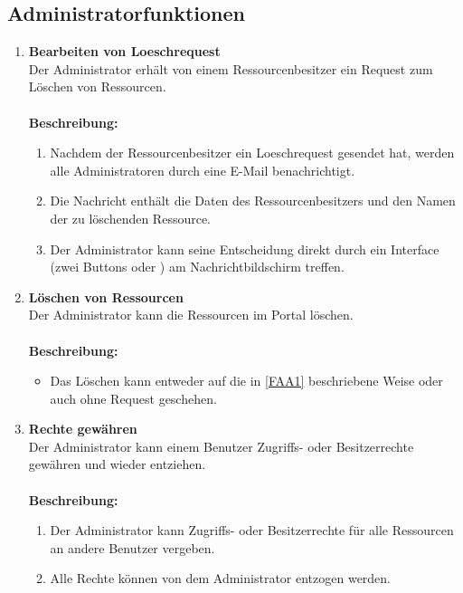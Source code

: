 \documentclass[parskip=full,11pt]{scrartcl}
\def\threedigits#1{%
  \ifnum#1<10 0\fi
  \ifnum#1<1 0\fi
  \number#1}
\begin{document}
\subsection{Administratorfunktionen}
\begin{enumerate}[label={\textbf{/F\protect\threedigits{\theenumi}0/}}, leftmargin=*, resume]
\item \label{FAA1}\textbf{Bearbeiten von Loeschrequest}\\ Der Administrator erhält von einem Ressourcenbesitzer ein Request zum Löschen von Ressourcen.\\\\
\textbf{Beschreibung:}\\
\begin{enumerate}[label=(\arabic*), leftmargin=*]
\item Nachdem der Ressourcenbesitzer ein Loeschrequest gesendet hat, werden alle Administratoren durch eine E-Mail benachrichtigt.
\item Die Nachricht enthält die Daten des Ressourcenbesitzers und den Namen der zu löschenden Ressource.
\item Der Administrator kann seine Entscheidung direkt durch ein Interface (zwei Buttons \grqq  \: oder \grqq  \:) am Nachrichtbildschirm treffen. 
\end{enumerate}


\item \label{FAA2} \textbf{Löschen von Ressourcen}\\ Der Administrator kann die Ressourcen im Portal löschen.\\\\
\textbf{Beschreibung:}\\
\begin{itemize}[itemsep=0pt, leftmargin=*]
\item Das Löschen kann entweder auf die in \ref{FAA1} beschriebene Weise oder auch ohne Request geschehen.
\end{itemize}

\newpage
\item \label{FAA3} \textbf{Rechte gewähren}\\ Der Administrator kann einem Benutzer Zugriffs- oder Besitzerrechte gewähren und wieder entziehen.\\\\
\textbf{Beschreibung:}\\
\begin{enumerate}[label=(\arabic*), leftmargin=*]
	\item Der Administrator kann Zugriffs- oder Besitzerrechte für alle Ressourcen an andere Benutzer vergeben.
	\item Alle Rechte können von dem Administrator entzogen werden.
	\end{enumerate}


\end{enumerate}
\end{document}
